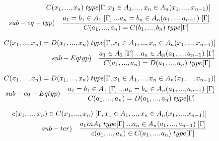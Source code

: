 \documentclass[10pt,a4paper, italian]{book}
\begin{document}
{{{\begin{equation}
\begin{split}
C(x_1,...,x_n)\hspace{0.1cm}type[\Gamma, x_1 \in A_1,...,x_n \in A_n(x_1,...,x_{n-1})] \\ sub-eq-typ) \quad \frac{a_1 = b_1  \in A_1\hspace{0.1cm}[\Gamma]\hspace{0.1cm}...a_n = b_n \in A_n(a_1,...,a_{n-1})\hspace{0.1cm}[\Gamma]}{C(a_1,...,a_n) = C(b_1,...,b_n) \hspace{0.1cm}type[\Gamma]}
\end{split}
\end{equation}

\begin{equation}
\begin{split}
C(x_1,...,x_n) = D(x_1,...,x_n) \hspace{0.1cm}type[\Gamma, x_1 \in A_1,...,x_n \in A_n(x_1,...,x_{n-1})] \\ sub-Eqtyp) \quad \frac{a_1 \in A_1\hspace{0.1cm}[\Gamma]\hspace{0.1cm}...a_n \in A_n(a_1,...,a_{n-1})\hspace{0.1cm}[\Gamma]}{C(a_1,...,a_n) = D(a_1,...,a_n)\hspace{0.1cm}type[\Gamma]}
\end{split}
\end{equation}

\begin{equation}
\begin{split}
C(x_1,...,x_n) = D(x_1,...,x_n) \hspace{0.1cm}type[\Gamma, x_1 \in A_1,...,x_n \in A_n(x_1,...,x_{n-1})] \\ sub-eq-Eqtyp) \quad \frac{a_1 = b_1\in A_1\hspace{0.1cm}[\Gamma]\hspace{0.1cm}...a_n = b_n \in A_n(a_1,...,a_{n-1})\hspace{0.1cm}[\Gamma]}{C(a_1,...,a_n) = D(a_1,...,a_n)\hspace{0.1cm}type[\Gamma]}
\end{split}
\end{equation}

\begin{equation}
\begin{split}
c(x_1,...,x_n) \in C(x_1,...,x_n) \hspace{0.1cm}[\Gamma, x_1 \in A_1,...,x_n \in A_n(x_1,...,x_{n-1})] \\ sub-ter) \quad \frac{a_1 in A_1\hspace{0.1cm}type[\Gamma]\hspace{0.1cm}...a_n \in A_n(a_1,...,a_{n-1})\hspace{0.1cm}[\Gamma]}{ c(a_1,...,a_n) \in C(a_1,...,a_n)\hspace{0.1cm}type[\Gamma]}
\end{split}
\end{equation}

}}}
\end{document}

